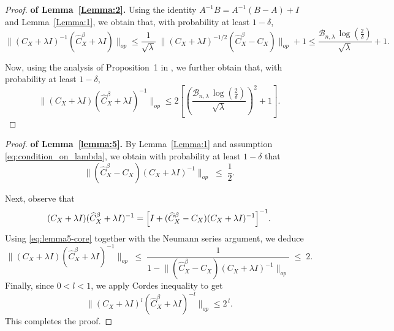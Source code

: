 \documentclass[twoside,11pt]{article}
\begin{document}
\begin{proof}\textbf{of Lemma~\ref{Lemma:2}.}
\noindent
Using the identity \(A^{-1}B = A^{-1}(B-A) + I\) and Lemma~\ref{Lemma:1}, we obtain that, with probability at least \(1-\delta\),
\[
\bigl\|
(C_{X}+\lambda I)^{-1} (\widehat{C}^{\beta}_{X}+\lambda I)
\bigr\|_{op}
\le
\frac{1}{\sqrt{\lambda}}\;
\bigl\|
(C_{X}+\lambda I)^{-1/2}
(  \widehat{C}_X^\beta - C_X)
\bigr\|_{op}
+ 1
\le
\frac{\mathcal{B}_{n,\lambda}\,
\log\!\left(\frac{2}{\delta}\right)}{\sqrt{\lambda}}
+ 1 .
\]

\noindent
Now, using the analysis of Proposition~1 in \cite{Distributed_learning}, we further obtain that, with probability at least \(1-\delta\),
\[
\bigl\|
(C_{X}+\lambda I)
(\widehat{C}^{\beta}_{X}+\lambda I)^{-1}
\bigr\|_{op}
\le
2
\left[
\left(
\frac{\mathcal{B}_{n,\lambda}\,
\log\!\left(\frac{2}{\delta}\right)}{\sqrt{\lambda}}
\right)^2
+ 1
\right].
\]
    
\end{proof}

\begin{proof}\textbf{of Lemma~\ref{lemma:5}.}
By Lemma~\ref{Lemma:1} and assumption \eqref{eq:condition_on_lambda}, we obtain with probability at least $1-\delta$ that
\begin{equation}\label{eq:lemma5-core}
\bigl\|
(\widehat{C}^\beta_X-C_X)(C_X+\lambda I)^{-1}
\bigr\|_{{op}}
\;\le\;
\frac12 .
\end{equation}

\noindent
Next, observe that
\[
(C_X+\lambda I)(\widehat{C}^\beta_X+\lambda I)^{-1}
=
\Bigl[
I+(\widehat{C}^\beta_X-C_X)(C_X+\lambda I)^{-1}
\Bigr]^{-1}.
\]
Using \eqref{eq:lemma5-core} together with the Neumann series argument, we deduce
\[
\bigl\|
(C_X+\lambda I)(\widehat{C}^\beta_X+\lambda I)^{-1}
\bigr\|_{{op}}
\;\le\;
\frac{1}{1-
\bigl\|(\widehat{C}^\beta_X-C_X)(C_X+\lambda I)^{-1}\bigr\|_{op}}
\;\le\;
2.
\]
Finally, since $0<l<1$, we apply Cordes inequality \cite{Cordes_1987} to get
\[
\bigl\|
(C_X+\lambda I)^l(\widehat{C}^\beta_X+\lambda I)^{-l}
\bigr\|_{{op}}
\le
2^{\,l}.
\]
This completes the proof.

\end{proof}
\end{document}
